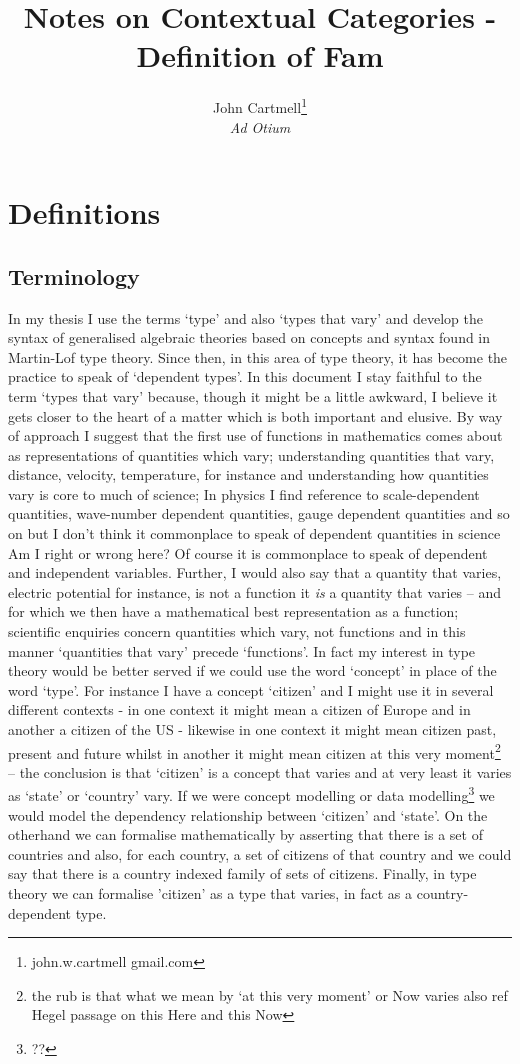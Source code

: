 \documentclass[10pt,a4paper]{scrartcl}
\title{Notes on Contextual Categories - Definition of Fam}
\author{John Cartmell\footnote{john.w.cartmell gmail.com}\\ \normalsize{\textit{Ad Otium}}}
\begin{document}
\maketitle

\section{Definitions}
\subsection{Terminology}
In my thesis I use the terms  `type' and also `types that vary' and develop the syntax of generalised algebraic theories based on concepts and syntax found in Martin-Lof type theory.
Since then, in this area of type theory,  it has become the practice to speak of `dependent types'. In this document I stay faithful to the term `types that vary' because, though it might be a little awkward, I believe it gets closer to the heart of a matter which is both important and elusive.
By way of approach I suggest that the first use of functions in mathematics comes about as representations of quantities which vary; understanding quantities that vary, distance, velocity, temperature, for instance and understanding how quantities vary is core to much of science;
In physics I find reference to scale-dependent quantities, wave-number dependent quantities, gauge dependent quantities and so on but I don't think it commonplace to speak of dependent 
quantities in science
Am I right or wrong here? Of course it is commonplace to speak of dependent and independent variables. 
Further, I would also say that a quantity that varies,  electric potential for instance, is not a function it \textit{is} a quantity that varies -- and for which we then have a mathematical best representation as a function; scientific enquiries concern quantities which vary, not functions and in 
this manner `quantities that vary' precede `functions'. 
\noindent
In fact my interest in type theory would be better served if we could use the
word `concept' in place of the word `type'. For instance I have a concept `citizen' and I might use it in several different contexts - in one context it might mean a citizen of Europe and in another a citizen of the US - likewise in one context it might mean citizen past, present and future whilst in another it might mean citizen at this very moment\footnote{the rub is that what we mean by `at this very moment' or Now varies also ref Hegel passage on this Here and this Now}  -- the conclusion is that `citizen' is a concept that varies and at very least it varies as `state' or `country' vary. If we were concept modelling or data modelling\footnote{??} we would model the dependency relationship between `citizen' 
and `state'. On the otherhand we can formalise mathematically by asserting that there is a set of countries
and also, for each country, a set of citizens of that country and we could say that there is a country indexed family of sets of citizens. Finally, in type theory we can formalise 'citizen' as 
a type that varies, in fact as a country-dependent type.
\end{document}
